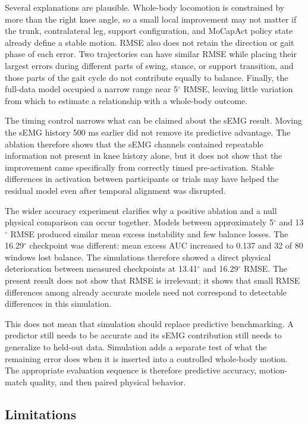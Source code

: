 \documentclass[referee,lineno,pdflatex,sn-vancouver-num]{sn-jnl}
\begin{document}
Several explanations are plausible. Whole-body locomotion is constrained by more than the right knee angle, so a small local improvement may not matter if the trunk, contralateral leg, support configuration, and MoCapAct policy state already define a stable motion. RMSE also does not retain the direction or gait phase of each error. Two trajectories can have similar RMSE while placing their largest errors during different parts of swing, stance, or support transition, and those parts of the gait cycle do not contribute equally to balance. Finally, the full-data model occupied a narrow range near 5$^{\circ}$ RMSE, leaving little variation from which to estimate a relationship with a whole-body outcome.

The timing control narrows what can be claimed about the sEMG result. Moving the sEMG history 500 ms earlier did not remove its predictive advantage. The ablation therefore shows that the sEMG channels contained repeatable information not present in knee history alone, but it does not show that the improvement came specifically from correctly timed pre-activation. Stable differences in activation between participants or trials may have helped the residual model even after temporal alignment was disrupted.

The wider accuracy experiment clarifies why a positive ablation and a null physical comparison can occur together. Models between approximately 5$^{\circ}$ and 13$^{\circ}$ RMSE produced similar mean excess instability and few balance losses. The 16.29$^{\circ}$ checkpoint was different: mean excess AUC increased to 0.137 and 32 of 80 windows lost balance. The simulations therefore showed a direct physical deterioration between measured checkpoints at 13.41$^{\circ}$ and 16.29$^{\circ}$ RMSE. The present result does not show that RMSE is irrelevant; it shows that small RMSE differences among already accurate models need not correspond to detectable differences in this simulation.

This does not mean that simulation should replace predictive benchmarking. A predictor still needs to be accurate and its sEMG contribution still needs to generalize to held-out data. Simulation adds a separate test of what the remaining error does when it is inserted into a controlled whole-body motion. The appropriate evaluation sequence is therefore predictive accuracy, motion-match quality, and then paired physical behavior.

\subsection{Limitations}
\end{document}
